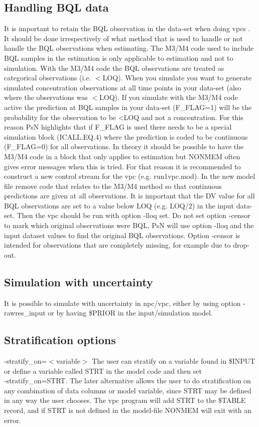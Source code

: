 \subsection{Handling BQL data}
It is important to retain the BQL observation in the data-set when doing vpcs \cite{BQL}. It should be done irrespectively of what method that is used to handle or not handle the BQL observations when estimating. The M3/M4 code used to include BQL samples in the estimation is only applicable to estimation and not to simulation. With the M3/M4 code the BQL observations are treated as categorical observations (i.e. $<$LOQ). When you simulate you want to generate simulated concentration observations at all time points in your data-set (also where the observations was $<$LOQ). If you simulate with the M3/M4 code active the prediction at BQL samples in your data-set (F\_FLAG=1) will be the probability for the observation to be <LOQ and not a concentration. For this reason PsN highlights that if F\_FLAG is used there needs to be a special simulation block (ICALL.EQ.4) where the prediction is coded to be continuous (F\_FLAG=0) for all observations. In theory it should be possible to have the M3/M4 code in a block that only applies to estimation but NONMEM often gives error messages when this is tried. For that reason it is recommended to construct a new control stream for the vpc (e.g. run1vpc.mod). In the new model file remove code that relates to the M3/M4 method so that continuous predictions are given at all observations. It is important that the DV value for all BQL observations are set to a value below LOQ (e.g. LOQ/2) in the input data-set. Then the vpc should be run with option -lloq set. Do not set option -censor to mark which original observations were BQL, PsN will use option -lloq and the input dataset values to find the original BQL observations. Option -censor is intended for observations that are completely missing, for example due to drop-out.

\subsection{Simulation with uncertainty}
It is possible to simulate with uncertainty in npc/vpc, either by using option -rawres\_input or by having \$PRIOR in the input/simulation model.

\subsection{Stratification options}
-stratify\_on=$<$variable$>$ The user can stratify on a variable found in \$INPUT or define a variable called STRT in the model code and then set\\ -stratify\_on=STRT. The later alternative allows the user to do stratification on any combination of data columns or model variable, since STRT may be defined in any way the user chooses. The vpc program will add STRT to the \$TABLE record, and if STRT is not defined in the model-file NONMEM will exit with an error. 

